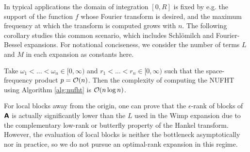 In typical applications the domain of integration $[0,R]$ is fixed by e.g. the
support of the function $f$ whose Fourier transform is desired, and the maximum
frequency at which the transform is computed grows with $n$. The following
corollary studies this common scenario, which includes Schl\"omilch and
Fourier-Bessel expansions. For notational conciseness, we consider the number of
terms $L$ and $M$ in each expansion as constants here.
\begin{corollary} \label{cor:complexity} Take $\omega_1 < \dots < \omega_n \in
    [0,\infty)$ and $r_1 < \dots < r_n \in [0,\infty)$ such that the
    space-frequency product $p = \mathcal{O}(n)$. Then the complexity of computing the
    NUFHT using Algorithm \ref{alg:nufht} is $\mathcal{O}(n\log n)$.
\end{corollary}

\begin{remark}
    For local blocks away from the origin, one can prove that the
    $\epsilon$-rank of blocks of $\bm{\mathsf{A}}$ is actually significantly lower than
    the $L$ used in the Wimp expansion due to the complementary low-rank or
    butterfly property of the Hankel transform. However, the evaluation of local
    blocks is neither the bottleneck asymptotically nor in practice, so we do
    not pursue an optimal-rank expansion in this regime.
\end{remark}